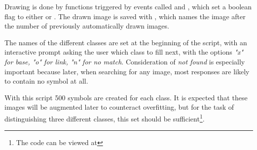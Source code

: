 Drawing is done by functions triggered by events called  and , which set a boolean  flag to either  or .
The drawn image is saved with , which names the image after the number of previously automatically drawn images.

The names of the different classes are set at the beginning of the script, with an interactive prompt asking the user which class to fill next, with the options \textit{"x" for base, "o" for link, "n" for no match}.
Consideration of \textit{not found} is especially important because later, when searching for any image, most responses are likely to contain no symbol at all.

With this script 500 symbols are created for each class.
It is expected that these images will be augmented later to counteract overfitting, but for the task of distinguishing three different classes, this set should be sufficient\footnote{The code can be viewed at }.

